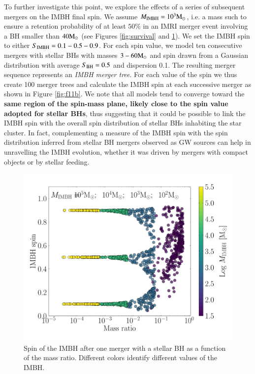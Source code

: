\documentclass[article]{aa}
\newcommand{\Ms}{{\rm M}_\odot}
\newcommand{\ibh}{{\rm IMBH}}
\newcommand{\bh}{{\rm BH}}
\begin{document}
{To further investigate this point, we explore the effects of a series of subsequent mergers on the IMBH final spin. We assume $M_\ibh = 10^3\Ms$, i.e. a mass such to ensure a retention probability of at least $50\%$ in an IMRI merger event involving a BH smaller than $40\Ms$ (see Figures  \ref{fig:survival} and \ref{fig:f11a}). We set the IMBH spin to either $S_\ibh = 0.1-0.5-0.9$. For each spin value, we model ten consecutive mergers with stellar BHs with masses $3-60\Ms$ and spin drawn from a Gaussian distribution with average $S_\bh = 0.5$ and dispersion 0.1. The resulting merger sequence represents an {\it IMBH merger tree}. For each value of the spin we thus create 100 merger trees and calculate the IMBH spin at each successive merger as shown in Figure \ref{fig:f11b}.
We note that all models tend to converge toward the {\bf same region of the spin-mass plane, likely close to the spin value adopted for stellar BHs}, thus suggesting that it could be possible to link the IMBH spin with the overall spin distribution of stellar BHs inhabiting the star cluster. In fact, complementing a measure of the IMBH spin with the spin distribution inferred from stellar BH mergers observed as GW sources can help in unravelling the IMBH evolution, whether it was driven by mergers with compact objects or by stellar feeding.
}

\begin{figure}
\centering
\includegraphics[width=\columnwidth]{track}
\caption{Spin of the IMBH after one merger with a stellar BH as a function of the mass ratio. Different colors identify different values of the IMBH.}
\label{fig:f11a}
\end{figure}
\end{document}
